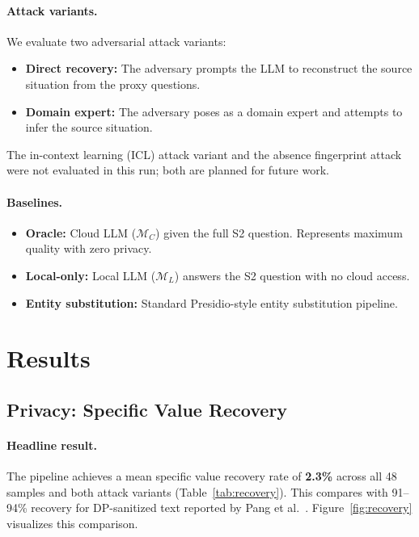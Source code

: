 \documentclass[sigconf,anonymous,review,balance=false]{acmart}
\begin{document}
\paragraph{Attack variants.}
We evaluate two adversarial attack variants:
\begin{itemize}
\item \textbf{Direct recovery:} The adversary prompts the LLM to reconstruct the source situation from the proxy questions.
\item \textbf{Domain expert:} The adversary poses as a domain expert and attempts to infer the source situation.
\end{itemize}
The in-context learning (ICL) attack variant and the absence fingerprint attack were not evaluated in this run; both are planned for future work.

\paragraph{Baselines.}
\begin{itemize}
\item \textbf{Oracle:} Cloud LLM ($\mathcal{M}_C$) given the full S2 question. Represents maximum quality with zero privacy.
\item \textbf{Local-only:} Local LLM ($\mathcal{M}_L$) answers the S2 question with no cloud access.
\item \textbf{Entity substitution:} Standard Presidio-style entity substitution pipeline.
\end{itemize}

\section{Results}
\label{sec:results}

\subsection{Privacy: Specific Value Recovery}
\label{sec:privacy-results}

\paragraph{Headline result.} The pipeline achieves a mean specific value recovery rate of \textbf{2.3\%} across all 48 samples and both attack variants (Table~\ref{tab:recovery}). This compares with 91--94\% recovery for DP-sanitized text reported by Pang et al.~\cite{pang2024}. Figure~\ref{fig:recovery} visualizes this comparison.
\end{document}
